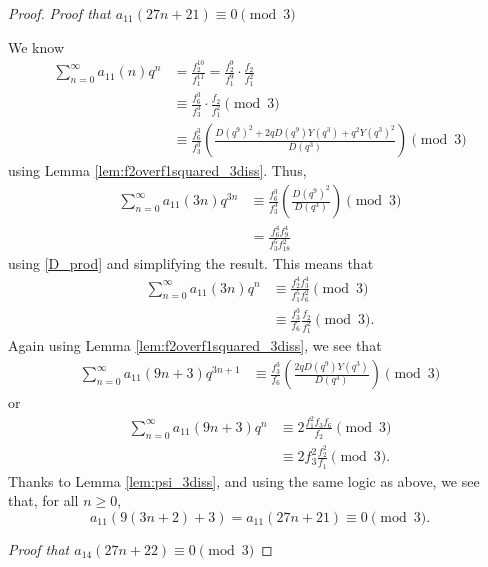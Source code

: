 \documentclass[10pt, reqno]{amsart}
\theoremstyle{theorem}
\theoremstyle{definition}
\theoremstyle{example}
\begin{document}
\begin{proof}
\bigskip  

\noindent
{\it Proof that $a_{11}(27n+21) \equiv 0 \pmod{3}$}

\bigskip 

\noindent 
We know 
\begin{align*}
\sum_{n=0}^\infty a_{11}(n)q^n 
&= 
\frac{f_2^{10}}{f_1^{11}} = 
\frac{f_2^9}{f_1^9}\cdot \frac{f_2}{f_1^2} \\
&\equiv 
\frac{f_{6}^3}{f_3^3}\cdot \frac{f_2}{f_1^2} \pmod{3}  \\
&\equiv 
\frac{f_6^3}{f_3^3}\left( \frac{D(q^9)^2 +2qD(q^9)Y(q^3)+q^2Y(q^3)^2}{D(q^3)}  \right) \pmod{3} 
\end{align*}
using Lemma \ref{lem:f2overf1squared_3diss}.  
Thus, 
\begin{align*}
\sum_{n=0}^\infty a_{11}(3n)q^{3n} 
&\equiv 
\frac{f_6^3}{f_3^3}\left( \frac{D(q^9)^2}{D(q^3)}  \right) \pmod{3}  \\
&= 
\frac{f_6^4f_9^4}{f_3^5f_{18}^2}
\end{align*}
using \eqref{D_prod} and simplifying the result.  This means that
\begin{align*}
\sum_{n=0}^\infty a_{11}(3n)q^{n} 
&\equiv 
\frac{f_2^4f_3^4}{f_1^5f_{6}^2} \pmod{3} \\
&\equiv 
\frac{f_3^3}{f_6}\frac{f_2}{f_1^2} \pmod{3}.
\end{align*}
Again using Lemma \ref{lem:f2overf1squared_3diss}, we see that 
\begin{align*}
\sum_{n=0}^\infty a_{11}(9n+3)q^{3n+1} 
&\equiv 
\frac{f_3^3}{f_6} \left( \frac{2qD(q^9)Y(q^3)}{D(q^3)} \right) \pmod{3}
\end{align*}
or 
\begin{align*}
\sum_{n=0}^\infty a_{11}(9n+3)q^{n} 
&\equiv 
2\frac{f_1^2f_3f_6}{f_2} \pmod{3} \\
&\equiv 
2f_3^2\frac{f_2^2}{f_1} \pmod{3}.
\end{align*}
Thanks to Lemma \ref{lem:psi_3diss}, and using the same logic as above, we see that, for all $n\geq 0$, 
\begin{equation*}
a_{11}(9(3n+2)+3) = a_{11}(27n+21) \equiv 0 \pmod{3}. 
\end{equation*}

\bigskip  

\noindent
{\it Proof that $a_{14}(27n+22) \equiv 0 \pmod{3}$}

\bigskip 


\end{proof}
\end{document}
